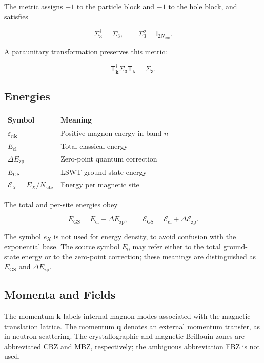 The metric assigns \(+1\) to the particle block and \(-1\) to the hole block, and satisfies

\[
\Sigma_3^\dagger=\Sigma_3,
\qquad
\Sigma_3^2=\mathsf I_{2N_{\mathrm{sub}}}.
\]

A paraunitary transformation preserves this metric:

\[
\mathsf T_{\mathbf k}^\dagger\Sigma_3\mathsf T_{\mathbf k}=\Sigma_3.
\]

\subsection{Energies}

\begin{longtable}[]{@{}ll@{}}
\toprule\noalign{}
Symbol & Meaning \\
\midrule\noalign{}
\endhead
\bottomrule\noalign{}
\endlastfoot
\(\varepsilon_{n\mathbf k}\) & Positive magnon energy in band \(n\) \\
\(E_{\mathrm{cl}}\) & Total classical energy \\
\(\Delta E_{\mathrm{zp}}\) & Zero-point quantum correction \\
\(E_{\mathrm{GS}}\) & LSWT ground-state energy \\
\(\mathcal E_X=E_X/N_{\mathrm{site}}\) & Energy per magnetic site \\
\end{longtable}

The total and per-site energies obey

\[
E_{\mathrm{GS}}=E_{\mathrm{cl}}+\Delta E_{\mathrm{zp}},
\qquad
\mathcal E_{\mathrm{GS}}=\mathcal E_{\mathrm{cl}}+\Delta\mathcal E_{\mathrm{zp}}.
\]

The symbol \(e_X\) is not used for energy density, to avoid confusion with the exponential base. The source symbol \(E_0\) may refer either to the total ground-state energy or to the zero-point correction; these meanings are distinguished as \(E_{\mathrm{GS}}\) and \(\Delta E_{\mathrm{zp}}\).

\subsection{Momenta and Fields}

The momentum \(\mathbf k\) labels internal magnon modes associated with the magnetic translation lattice. The momentum \(\mathbf q\) denotes an external momentum transfer, as in neutron scattering. The crystallographic and magnetic Brillouin zones are abbreviated CBZ and MBZ, respectively; the ambiguous abbreviation FBZ is not used.


